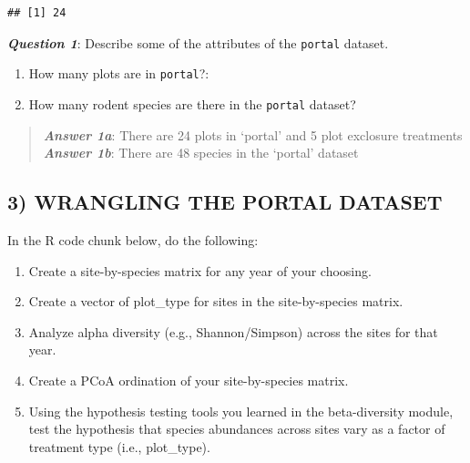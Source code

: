 \documentclass[]{article}
\newenvironment{Shaded}{\begin{snugshade}}{\end{snugshade}}
\newcommand{\KeywordTok}[1]{\textcolor[rgb]{0.13,0.29,0.53}{\textbf{{#1}}}}
\newcommand{\NormalTok}[1]{{#1}}
\providecommand{\tightlist}{%
  \setlength{\itemsep}{0pt}\setlength{\parskip}{0pt}}
\begin{document}
\begin{Shaded}
\end{Shaded}

\begin{verbatim}
## [1] 24
\end{verbatim}

\textbf{\emph{Question 1}}: Describe some of the attributes of the
\texttt{portal} dataset.

\begin{enumerate}
\def\labelenumi{\alph{enumi}.}
\tightlist
\item
  How many plots are in \texttt{portal}?:
\item
  How many rodent species are there in the \texttt{portal} dataset?
\end{enumerate}

\begin{quote}
\textbf{\emph{Answer 1a}}: There are 24 plots in `portal' and 5 plot
exclosure treatments \textbf{\emph{Answer 1b}}: There are 48 species in
the `portal' dataset
\end{quote}

\subsection{3) WRANGLING THE PORTAL
DATASET}\label{wrangling-the-portal-dataset}

In the R code chunk below, do the following:

\begin{enumerate}
\def\labelenumi{\arabic{enumi}.}
\tightlist
\item
  Create a site-by-species matrix for any year of your choosing.
\item
  Create a vector of plot\_type for sites in the site-by-species matrix.
\item
  Analyze alpha diversity (e.g., Shannon/Simpson) across the sites for
  that year.
\item
  Create a PCoA ordination of your site-by-species matrix.
\item
  Using the hypothesis testing tools you learned in the beta-diversity
  module, test the hypothesis that species abundances across sites vary
  as a factor of treatment type (i.e., plot\_type).
\end{enumerate}
\end{document}
